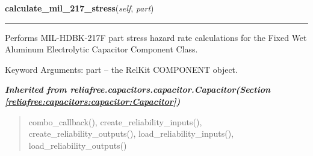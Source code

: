 \hspace{.8\funcindent}\begin{boxedminipage}{\funcwidth}

    \raggedright \textbf{calculate\_mil\_217\_stress}(\textit{self}, \textit{part})

    \vspace{-1.5ex}

    \rule{\textwidth}{0.5\fboxrule}
\setlength{\parskip}{2ex}
    Performs MIL-HDBK-217F part stress hazard rate calculations for the 
    Fixed Wet Aluminum Electrolytic Capacitor Component Class.

    Keyword Arguments: part -- the RelKit COMPONENT object.

\setlength{\parskip}{1ex}
    \end{boxedminipage}


\large{\textbf{\textit{Inherited from reliafree.capacitors.capacitor.Capacitor\textit{(Section \ref{reliafree:capacitors:capacitor:Capacitor})}}}}

\begin{quote}
combo\_callback(), create\_reliability\_inputs(), create\_reliability\_outputs(), load\_reliability\_inputs(), load\_reliability\_outputs()
\end{quote}
